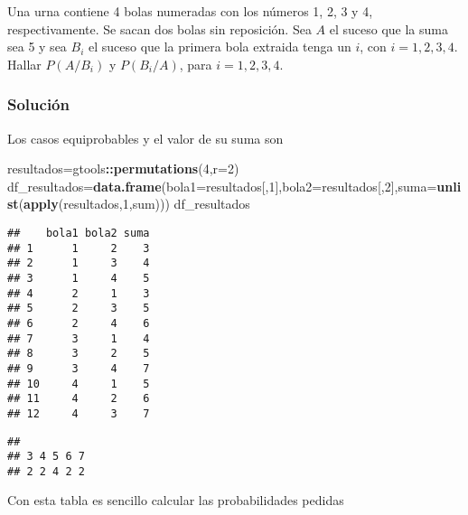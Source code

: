 \documentclass[
]{article}
\newenvironment{Shaded}{\begin{snugshade}}{\end{snugshade}}
\newcommand{\DataTypeTok}[1]{\textcolor[rgb]{0.13,0.29,0.53}{#1}}
\newcommand{\DecValTok}[1]{\textcolor[rgb]{0.00,0.00,0.81}{#1}}
\newcommand{\KeywordTok}[1]{\textcolor[rgb]{0.13,0.29,0.53}{\textbf{#1}}}
\newcommand{\NormalTok}[1]{#1}
\newcommand{\OperatorTok}[1]{\textcolor[rgb]{0.81,0.36,0.00}{\textbf{#1}}}
\begin{document}
Una urna contiene 4 bolas numeradas con los números 1, 2, 3 y 4,
respectivamente. Se sacan dos bolas sin reposición. Sea \(A\) el suceso
que la suma sea 5 y sea \(B_i\) el suceso que la primera bola extraida
tenga un \(i\), con \(i=1,2,3,4\). Hallar \(P(A/B_i)\) y \(P(B_i/A)\),
para \(i=1,2,3,4\).

\hypertarget{soluciuxf3n-5}{%
\subsubsection{Solución}\label{soluciuxf3n-5}}

Los casos equiprobables y el valor de su suma son

\begin{Shaded}
\begin{Highlighting}[]
\NormalTok{resultados=gtools}\OperatorTok{::}\KeywordTok{permutations}\NormalTok{(}\DecValTok{4}\NormalTok{,}\DataTypeTok{r=}\DecValTok{2}\NormalTok{)}
\NormalTok{df_resultados=}\KeywordTok{data.frame}\NormalTok{(}\DataTypeTok{bola1=}\NormalTok{resultados[,}\DecValTok{1}\NormalTok{],}\DataTypeTok{bola2=}\NormalTok{resultados[,}\DecValTok{2}\NormalTok{],}\DataTypeTok{suma=}\KeywordTok{unlist}\NormalTok{(}\KeywordTok{apply}\NormalTok{(resultados,}\DecValTok{1}\NormalTok{,sum)))}
\NormalTok{df_resultados}
\end{Highlighting}
\end{Shaded}

\begin{verbatim}
##    bola1 bola2 suma
## 1      1     2    3
## 2      1     3    4
## 3      1     4    5
## 4      2     1    3
## 5      2     3    5
## 6      2     4    6
## 7      3     1    4
## 8      3     2    5
## 9      3     4    7
## 10     4     1    5
## 11     4     2    6
## 12     4     3    7
\end{verbatim}

\begin{Shaded}
\end{Shaded}

\begin{verbatim}
## 
## 3 4 5 6 7 
## 2 2 4 2 2
\end{verbatim}

Con esta tabla es sencillo calcular las probabilidades pedidas
\end{document}
